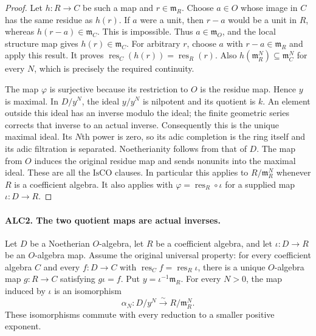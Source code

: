 \documentclass[11pt,a4paper]{article}
\numberwithin{equation}{section}
\theoremstyle{remark}\newtheorem{remark}[theorem]{Remark}
\begin{document}
\begin{proof}
Let \(h:R\to C\) be such a map and \(r\in\mathfrak m_R\).
Choose \(a\in O\) whose image in \(C\) has the same residue
as \(h(r)\).  If \(a\) were a unit, then \(r-a\) would be
a unit in \(R\), whereas \(h(r-a)\in\mathfrak m_C\).
This is impossible.  Thus \(a\in\mathfrak m_O\), and the
local structure map gives \(h(r)\in\mathfrak m_C\).
For arbitrary \(r\), choose \(a\) with \(r-a\in\mathfrak m_R\)
and apply this result.  It proves
\(\operatorname{res}_C(h(r))=\operatorname{res}_R(r)\).
Also \(h(\mathfrak m_R^N)\subseteq\mathfrak m_C^N\) for
every \(N\), which is precisely the required continuity.

The map \(\varphi\) is surjective because its restriction to
\(O\) is the residue map.  Hence \(y\) is maximal.  In
\(D/y^N\), the ideal \(y/y^N\) is nilpotent and its quotient
is \(k\).  An element outside this ideal has an inverse modulo
the ideal; the finite geometric series corrects that inverse to
an actual inverse.  Consequently this is the unique maximal ideal.
Its \(N\)th power is zero, so its adic completion is the ring
itself and its adic filtration is separated.  Noetherianity follows
from that of \(D\).  The map from \(O\) induces the original
residue map and sends nonunits into the maximal ideal.  These are
all the \(\mathrm{IsCO}\) clauses.  In particular this applies
to \(R/\mathfrak m_R^N\) whenever \(R\) is a coefficient
algebra.  It also applies with
\(\varphi=\operatorname{res}_R\circ\iota\) for a supplied
map \(\iota:D\to R\).
\end{proof}

\paragraph{ALC2. The two quotient maps are actual inverses.}
\label{claim:ALC2}
Let \(D\) be a Noetherian \(O\)-algebra, let \(R\) be a
coefficient algebra, and let \(\iota:D\to R\) be an
\(O\)-algebra map.  Assume the original universal property:
for every coefficient algebra \(C\) and every \(f:D\to C\)
with \(\operatorname{res}_C f=\operatorname{res}_R\iota\),
there is a unique \(O\)-algebra map \(g:R\to C\) satisfying
\(g\iota=f\).  Put \(y=\iota^{-1}\mathfrak m_R\).
For every \(N>0\), the map induced by \(\iota\) is an
isomorphism
\[
 \alpha_N:D/y^N\xrightarrow{\ \sim\ }R/\mathfrak m_R^N.
                                                        \tag{ALC.3}
\]
These isomorphisms commute with every reduction to a smaller
positive exponent.
\end{document}
